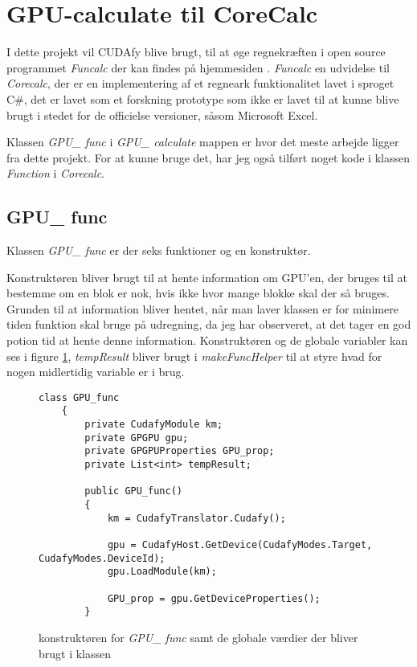 \section{GPU-calculate til CoreCalc}
\label{GPU_CC}
I dette projekt vil CUDAfy blive brugt, til at øge regnekræften i open source programmet \textit{Funcalc} der kan findes på hjemmesiden \cite{FuncalcHome}.
\textit{Funcalc} en udvidelse til \textit{Corecalc}, der er en implementering af et regneark funktionalitet lavet i sproget C\#, det er lavet som et forskning prototype som ikke er lavet til at kunne blive brugt i stedet for de officielse versioner, såsom Microsoft Excel.

Klassen \textit{GPU\_ func} i \textit{GPU\_ calculate} mappen er hvor det meste arbejde ligger fra dette projekt. For at kunne bruge det, har jeg også tilført noget kode i klassen \textit{Function} i \textit{Corecalc}.

\subsection{GPU\_ func}
Klassen \textit{GPU\_ func} er der seks funktioner og en konstruktør.

Konstruktøren bliver brugt til at hente information om GPU'en, der bruges til at bestemme om en blok er nok, hvis ikke hvor mange blokke skal der så bruges. Grunden til at information bliver hentet, når man laver klassen er for minimere tiden funktion skal bruge på udregning, da jeg har observeret, at det tager en god potion tid at hente denne information. Konstruktøren og de globale variabler kan ses i figure \ref{fig:GPU_func_K}, \textit{tempResult} bliver brugt i \textit{makeFuncHelper} til at styre hvad for nogen midlertidig variable er i brug.

\begin{figure}[!ht]
    \centering
    \lstset{style=sharpc}
	\begin{lstlisting}
class GPU_func
    {
        private CudafyModule km;
        private GPGPU gpu;
        private GPGPUProperties GPU_prop;
        private List<int> tempResult;
        
        public GPU_func()
        {
            km = CudafyTranslator.Cudafy();

            gpu = CudafyHost.GetDevice(CudafyModes.Target, CudafyModes.DeviceId);
            gpu.LoadModule(km);

            GPU_prop = gpu.GetDeviceProperties();
        }
	\end{lstlisting}
    \caption{konstruktøren for \textit{GPU\_ func} samt de globale værdier der bliver brugt i klassen}
    \label{fig:GPU_func_K}
\end{figure}

